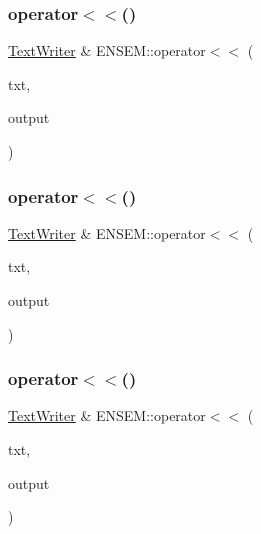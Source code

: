 \subsubsection{\texorpdfstring{operator$<$$<$()}{operator<<()}\hspace{0.1cm}{\footnotesize\ttfamily [1/26]}}
{\footnotesize\ttfamily \mbox{\hyperlink{classENSEM_1_1TextWriter}{Text\+Writer}} \& E\+N\+S\+E\+M\+::operator$<$$<$ (\begin{DoxyParamCaption}\item[{\mbox{\hyperlink{classENSEM_1_1TextWriter}{Text\+Writer}} \&}]{txt,  }\item[{const std\+::string \&}]{output }\end{DoxyParamCaption})}

\mbox{\label{group__io_ga1d3217dcbc1fea5b302c0b53833dad39}} 
\subsubsection{\texorpdfstring{operator$<$$<$()}{operator<<()}\hspace{0.1cm}{\footnotesize\ttfamily [2/26]}}
{\footnotesize\ttfamily \mbox{\hyperlink{classENSEM_1_1TextWriter}{Text\+Writer}} \& E\+N\+S\+E\+M\+::operator$<$$<$ (\begin{DoxyParamCaption}\item[{\mbox{\hyperlink{classENSEM_1_1TextWriter}{Text\+Writer}} \&}]{txt,  }\item[{char}]{output }\end{DoxyParamCaption})}

\mbox{\label{group__io_gaf097695886fb51a3d6c35f6b0bac14fc}} 
\subsubsection{\texorpdfstring{operator$<$$<$()}{operator<<()}\hspace{0.1cm}{\footnotesize\ttfamily [3/26]}}
{\footnotesize\ttfamily \mbox{\hyperlink{classENSEM_1_1TextWriter}{Text\+Writer}} \& E\+N\+S\+E\+M\+::operator$<$$<$ (\begin{DoxyParamCaption}\item[{\mbox{\hyperlink{classENSEM_1_1TextWriter}{Text\+Writer}} \&}]{txt,  }\item[{const char $\ast$}]{output }\end{DoxyParamCaption})}

